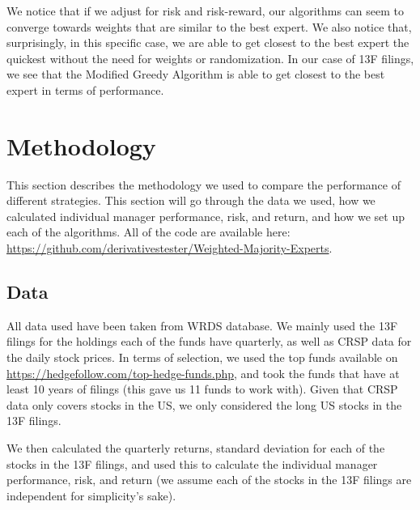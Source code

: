 \documentclass{article}
\begin{document}
We notice that if we adjust for risk and risk-reward, our algorithms can seem to converge towards weights that are similar to the best expert. We also notice that, surprisingly, in this specific case, we are able to get closest to the best expert the quickest without the need for weights or randomization. In our case of 13F filings, we see that the Modified Greedy Algorithm is able to get closest to the best expert in terms of performance.

\section{Methodology}
\label{sec:methodology}

This section describes the methodology we used to compare the performance of different strategies. This section will go through the data we used, how we calculated individual manager performance, risk, and return, and how we set up each of the algorithms. All of the code are available here: \url{https://github.com/derivativestester/Weighted-Majority-Experts}.

\subsection{Data}
\label{subsec:data}
All data used have been taken from WRDS database. We mainly used the 13F filings for the holdings each of the funds have quarterly, as well as CRSP data for the daily stock prices. In terms of selection, we used the top funds available on \url{https://hedgefollow.com/top-hedge-funds.php}, and took the funds that have at least 10 years of filings (this gave us 11 funds to work with). Given that CRSP data only covers stocks in the US, we only considered the long US stocks in the 13F filings. 

We then calculated the quarterly returns, standard deviation for each of the stocks in the 13F filings, and used this to calculate the individual manager performance, risk, and return (we assume each of the stocks in the 13F filings are independent for simplicity's sake).
\end{document}
